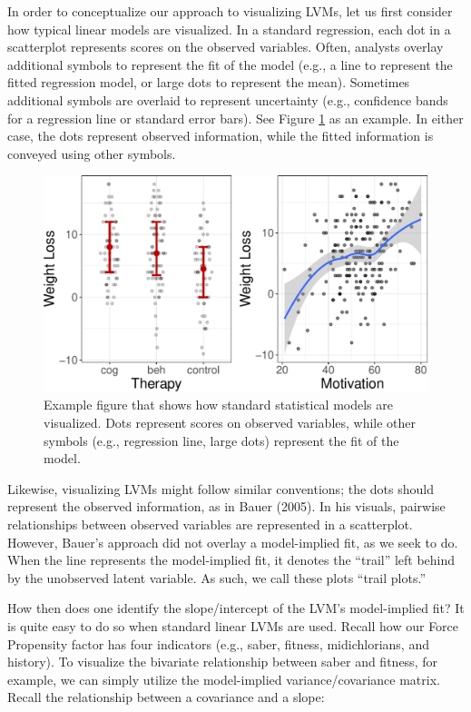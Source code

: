 \documentclass[
  english,
  doc]{apa6}
\begin{document}
In order to conceptualize our approach to visualizing LVMs, let us first consider how typical linear models are visualized. In a standard regression, each dot in a scatterplot represents scores on the observed variables. Often, analysts overlay additional symbols to represent the fit of the model (e.g., a line to represent the fitted regression model, or large dots to represent the mean). Sometimes additional symbols are overlaid to represent uncertainty (e.g., confidence bands for a regression line or standard error bars). See Figure \ref{fig:scatter} as an example. In either case, the dots represent observed information, while the fitted information is conveyed using other symbols.

\begin{figure}
\centering
\includegraphics{flexplavaan_draft_files/figure-latex/scatter-1.pdf}
\caption{\label{fig:scatter}Example figure that shows how standard statistical models are visualized. Dots represent scores on observed variables, while other symbols (e.g., regression line, large dots) represent the fit of the model.}
\end{figure}

Likewise, visualizing LVMs might follow similar conventions; the dots should represent the observed information, as in Bauer (2005). In his visuals, pairwise relationships between observed variables are represented in a scatterplot. However, Bauer's approach did not overlay a model-implied fit, as we seek to do. When the line represents the model-implied fit, it denotes the ``trail'' left behind by the unobserved latent variable. As such, we call these plots ``trail plots.''

How then does one identify the slope/intercept of the LVM's model-implied fit? It is quite easy to do so when standard linear LVMs are used. Recall how our Force Propensity factor has four indicators (e.g., saber, fitness, midichlorians, and history). To visualize the bivariate relationship between saber and fitness, for example, we can simply utilize the model-implied variance/covariance matrix. Recall the relationship between a covariance and a slope:
\end{document}
